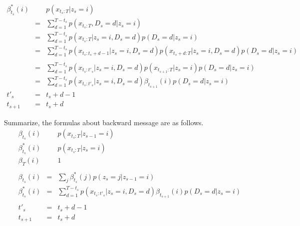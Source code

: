 \documentclass[a4paper]{article}
\DeclareMathOperator{\defeq}{\ensuremath{\stackrel{\mathrm{def}}{=}}}
\begin{document}
\begin{eqnarray}
	\beta_{t_s}^{*}(i)
	&\defeq&
	p(x_{t_s:T} | z_s = i) \\
	&=&
	\sum_{d=1}^{T-t_s}{p(x_{t_s:T}, D_s = d | z_s = i)} \\
	&=&
	\sum_{d=1}^{T-t_s}{p(x_{t_s:T} | z_s = i, D_s = d) p(D_s = d | z_s = i)} \\
	&=&
	\sum_{d=1}^{T-t_s}{p(x_{t_s:t_s+d-1} | z_s = i, D_s = d) p(x_{t_s+d:T} | z_s = i, D_s = d) p(D_s = d | z_s = i)} \nonumber \\ \\
	&=&
	\sum_{d=1}^{T-t_s}{p(x_{t_s:t'_s} | z_s = i, D_s = d) p(x_{t_{s+1}:T} | z_s = i) p(D_s = d | z_s = i)} \\
	&=&
	\sum_{d=1}^{T-t_s}{p(x_{t_s:t'_s} | z_s = i, D_s = d) \beta_{t_{s+1}}(i) p(D_s = d | z_s = i)}\\
t'_s &=& t_s + d - 1 \\
t_{s+1} &=& t_s + d
\end{eqnarray}

Summarize, the formulas about backward message are as follows.
\begin{eqnarray}
	\beta_{t_s}(i)
	&\defeq&
	p(x_{t_s:T} | z_{s-1} = i) \\
	\beta_{t_s}^{*}(i)
	&\defeq&
	p(x_{t_s:T} | z_s = i) \\
	\beta_{T}(i)
	&\defeq&
	1 \\
	\nonumber \\
	\beta_{t_s}(i)
	&=&
	\sum_{j}{\beta_{t_s}^{*}(j) p(z_s = j | z_{s-1} = i)} \\
	\beta_{t_s}^{*}(i)
	&=&
	\sum_{d=1}^{T-t_s}{p(x_{t_s:t'_s} | z_s = i, D_s = d) \beta_{t_{s+1}}(i) p(D_s = d | z_s = i)} \\
	\nonumber \\
	t'_s &=& t_s + d - 1 \\
	t_{s+1} &=& t_s + d
\end{eqnarray}
\end{document}
